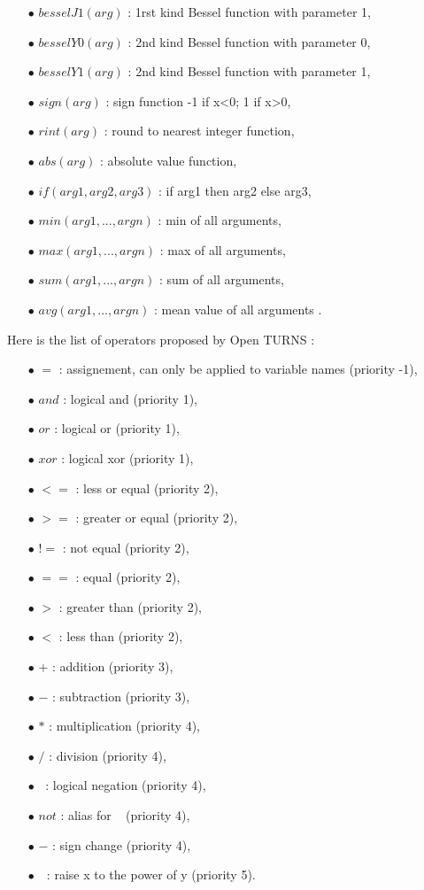 \begin{itemize}
\item[$\bullet$] $besselJ1(arg)$  :  1rst kind Bessel function with parameter 1,
\item[$\bullet$] $besselY0(arg)$  :  2nd kind Bessel function with parameter 0,
\item[$\bullet$] $besselY1(arg)$  :  2nd kind Bessel function with parameter 1,
\item[$\bullet$] $sign(arg)$  :  sign function -1 if x<0; 1 if x>0,
\item[$\bullet$] $rint(arg)$  :  round to nearest integer function,
\item[$\bullet$] $abs(arg)$  :  absolute value function,
\item[$\bullet$] $if(arg1, arg2, arg3)$  :  if arg1 then arg2 else arg3,
\item[$\bullet$] $min(arg1, ..., argn)$  :  min of all arguments,
\item[$\bullet$] $max(arg1, ..., argn)$  :  max of all arguments,
\item[$\bullet$] $sum(arg1, ..., argn)$  :  sum of all arguments,
\item[$\bullet$] $avg(arg1, ..., argn)$  :  mean value of all arguments .
\end{itemize}

Here is the list of operators proposed by Open TURNS :
\begin{itemize}
\item[$\bullet$] $=$ : assignement, can only be applied to variable names (priority -1),
\item[$\bullet$] $and$ : logical and (priority 1),
\item[$\bullet$] $or$ : logical or (priority 1),
\item[$\bullet$] $xor$ : logical xor (priority 1),
\item[$\bullet$] $<=$ : less or equal (priority 2),
\item[$\bullet$] $>=$ : greater or equal (priority 2),
\item[$\bullet$] $!=$ : not equal (priority 2),
\item[$\bullet$] $==$ : equal (priority 2),
\item[$\bullet$] $>$ : greater than (priority 2),
\item[$\bullet$] $<$ : less than (priority 2),
\item[$\bullet$] $+$ : addition (priority 3),
\item[$\bullet$] $-$ : subtraction (priority 3),
\item[$\bullet$] $*$ : multiplication (priority 4),
\item[$\bullet$] $/$ : division (priority 4),
\item[$\bullet$] $~$ : logical negation (priority 4),
\item[$\bullet$] $not$ : alias for ~ (priority 4),
\item[$\bullet$] $-$ : sign change (priority 4),
\item[$\bullet$] ${\, }^{\, }$ : raise x to the power of y (priority 5).
\end{itemize}


